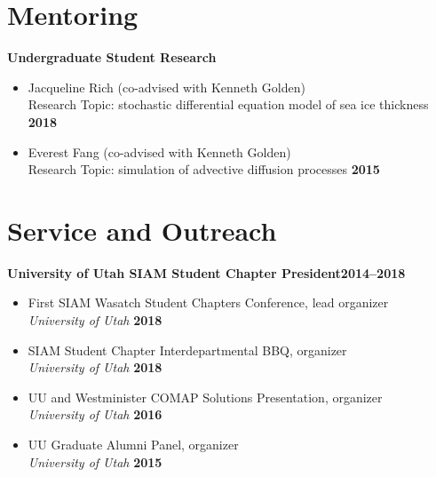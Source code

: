 \documentclass[margin,line]{res}
\begin{document}
\begin{resume}
\section{\sc Mentoring}
{\bf Undergraduate Student Research}
\begin{itemize}
\item[ ] Jacqueline Rich (co-advised with Kenneth Golden) \\
Research Topic: stochastic differential equation model of sea ice thickness \hfill {\bf 2018} 
\item[ ] Everest Fang (co-advised with Kenneth Golden) \\
Research Topic: simulation of advective diffusion processes \hfill {\bf 2015}
\end{itemize}

\section{\sc Service and Outreach}

{\bf University of Utah SIAM Student Chapter President}\hfill{\bf 2014--2018}
\begin{itemize}
\item[ ] First SIAM Wasatch Student Chapters Conference, lead organizer
\\ {\it University of Utah} \hfill {\bf 2018}
\item[ ] SIAM Student Chapter Interdepartmental BBQ, organizer
\\ {\it University of Utah} \hfill {\bf 2018}
\item[ ] UU and Westminister COMAP Solutions Presentation, organizer
\\ {\it University of Utah} \hfill {\bf 2016}
\item[ ] UU Graduate Alumni Panel, organizer 
\\ {\it University of Utah} \hfill {\bf 2015}
\end{itemize}


\end{resume}
\end{document}
